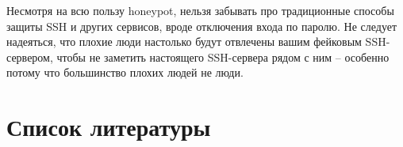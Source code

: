 \documentclass[a4page]{article}
\begin{document}
Несмотря на всю пользу honeypot, нельзя забывать про традиционные способы защиты SSH и других сервисов, вроде отключения входа по паролю. Не следует надеяться, что плохие люди настолько будут отвлечены вашим фейковым SSH-сервером, чтобы не заметить настоящего SSH-сервера рядом с ним -- особенно потому что большинство плохих людей не люди.


\newpage

\section{Список литературы}

\printbibliography [heading=none]
\end{document}
